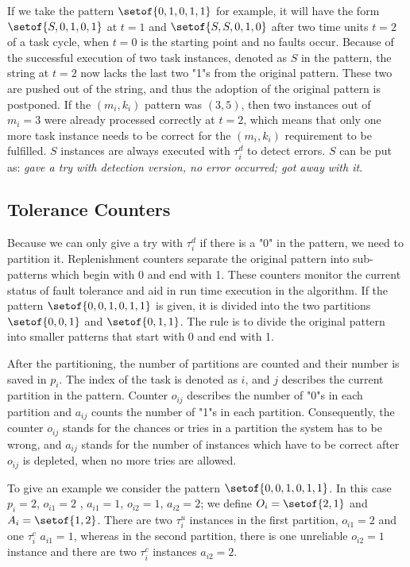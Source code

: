 If we take the pattern $\setof{0,1,0,1,1}$ for example, it will have the form $\setof{S,0,1,0,1}$ at $t=1$ and $\setof{S,S,0,1,0}$ after two time units $t=2$ of a task cycle, when $t=0$ is the starting point and no faults occur. Because of the successful execution of two task instances, denoted as $S$ in the pattern, the string at $t=2$ now lacks the last two "1"s from the original pattern. These two are pushed out of the string, and thus the adoption of the original pattern is postponed. If the $(m_i,k_i)$ pattern was $(3,5)$, then two instances out of $m_i=3$ were already processed correctly at $t=2$, which means that only one more task instance needs to be correct for the $(m_i,k_i)$ requirement to be fulfilled. $S$ instances are always executed with $\tau^d_i$ to detect errors. $S$ can be put as: \textit{gave a try with detection version, no error occurred; got away with it}.

\subsection{Tolerance Counters}
Because we can only give a try with $\tau_i^d$ if there is a "0" in the pattern, we need to partition it.
Replenishment counters separate the original pattern into sub-patterns which begin with 0 and end with 1. These counters monitor the current status of fault tolerance and aid in run time execution in the algorithm. If the pattern $\setof{0,0,1,0,1,1}$ is given, it is divided into the two partitions $\setof{0,0,1}$ and $\setof{0,1,1}$. The rule is to divide the original pattern into smaller patterns that start with 0 and end with 1. 

After the partitioning, the number of partitions are counted and their number is saved in $p_i$. The index of the task is denoted as $i$, and $j$ describes the current partition in the pattern. Counter $o_{ij}$ describes the number of "0"s in each partition and $a_{ij}$ counts the number of "1"s in each partition. Consequently, the counter $o_{ij}$ stands for the chances or tries in a partition the system has to be wrong, and $a_{ij}$ stands for the number of instances which have to be correct after $o_{ij}$ is depleted, when no more tries are allowed.

To give an example we consider the pattern $\setof{0,0,1,0,1,1}$. In this case $p_i=2$, $o_{i1}=2$ , $a_{i1}=1$, $o_{i2}=1$, $a_{i2}=2$; we define $O_i = \setof{2,1}$  and $A_i =\setof{1,2}$. There are two $\tau_i^u$ instances in the first partition, $o_{i1}=2$ and one $\tau_i^c$ $a_{i1}=1$, whereas in the second partition, there is one unreliable $o_{i2}=1$ instance and there are two $\tau_i^c$ instances $a_{i2}=2$.

